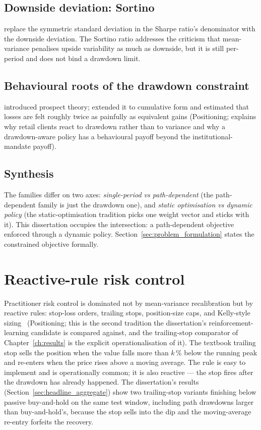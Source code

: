\subsection{Downside deviation: Sortino}
\label{sec:sortino}

\textcite{sortino1994downside} replace the symmetric standard deviation in the Sharpe ratio's denominator with the downside deviation. The Sortino ratio addresses the criticism that mean-variance penalises upside variability as much as downside, but it is still per-period and does not bind a drawdown limit.

\subsection{Behavioural roots of the drawdown constraint}
\label{sec:behavioural}

\textcite{kahneman1979prospect} introduced prospect theory; \textcite{tversky1992cumulative} extended it to cumulative form and estimated that losses are felt roughly twice as painfully as equivalent gains (Positioning; explains why retail clients react to drawdown rather than to variance and why a drawdown-aware policy has a behavioural payoff beyond the institutional-mandate payoff).

\subsection{Synthesis}
\label{sec:risk_synthesis}

The families differ on two axes: \emph{single-period vs path-dependent} (the path-dependent family is just the drawdown one), and \emph{static optimisation vs dynamic policy} (the static-optimisation tradition picks one weight vector and sticks with it). This dissertation occupies the intersection: a path-dependent objective enforced through a dynamic policy. Section~\ref{sec:problem_formulation} states the constrained objective formally.

\section{Reactive-rule risk control}
\label{sec:reactive_rules}

Practitioner risk control is dominated not by mean-variance recalibration but by reactive rules: stop-loss orders, trailing stops, position-size caps, and Kelly-style sizing~\parencite{kelly1956new} (Positioning; this is the second tradition the dissertation's reinforcement-learning candidate is compared against, and the trailing-stop comparator of Chapter~\ref{ch:results} is the explicit operationalisation of it). The textbook trailing stop sells the position when the value falls more than $k$\,\% below the running peak and re-enters when the price rises above a moving average. The rule is easy to implement and is operationally common; it is also reactive --- the stop fires after the drawdown has already happened. The dissertation's results (Section~\ref{sec:headline_aggregate}) show two trailing-stop variants finishing below passive buy-and-hold on the same test window, including path drawdowns larger than buy-and-hold's, because the stop sells into the dip and the moving-average re-entry forfeits the recovery.

